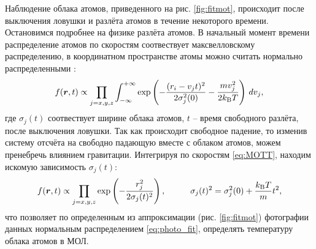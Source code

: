 Наблюдение облака атомов, приведенного на рис. \ref{fig:fitmot}, происходит после выключения ловушки и разлёта атомов в течение некоторого времени. Остановимся подробнее на физике разлёта атомов. В начальный момент времени распределение атомов по скоростям соотвествует максвелловскому распределению, в координатном пространстве атомы можно считать нормально распределенными \cite{vlad}:
\begin{equation}
    f(\boldsymbol{r}, t) \propto \prod_{j=x,y,z} \int_{-\infty}^{+\infty} 
    \exp\left(
        - \frac{(r_i-v_j t)^2}{2 \sigma_j^2(0)} - \frac{m v_j^2}{2 k_{\textnormal{B}} T}
    \right)
    \, d v_j,
    \label{eq:MOTT}
\end{equation}
где $\sigma_j(t)$ соотвествует ширине облака атомов, $t$ -- время свободного разлёта, после выключения ловушки. Так как происходит свободное падение, то изменив систему отсчёта на свободно падающую вместе с облаком атомов, можем пренебречь влиянием гравитации. Интегрируя по скоростям \eqref{eq:MOTT}, находим искомую зависимость $\sigma_j(t)$:
\begin{equation*}
    f(\vc{r},t) \propto \prod_{j=x,y,z} \exp\left(
        - \frac{r_j^2}{2 \sigma_j(t)^2}
    \right),
    \hspace{10 mm} 
    \sigma_j(t)^2 =  \sigma_j^2(0) + \frac{\kB T}{m} t^2,
\end{equation*}
что позволяет по определенным из аппроксимации (рис. \ref{fig:fitmot}) фотографии данных нормальным распределением \eqref{eq:photo_fit}, определять температуру облака атомов в МОЛ. 



